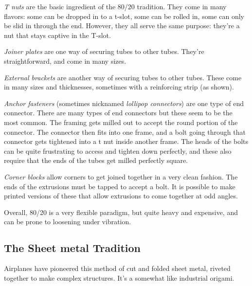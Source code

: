 \documentclass[10pt,letterpaper]{book}
\begin{document}
	\begin{asparaenum}[a)]
		\item \textit{T nuts} are the basic ingredient of the 80/20 tradition. They come in many flavors: some can be dropped in to a t-slot, some can be rolled in, some can only be slid in through the end. However, they all serve the same purpose: they're a nut that stays captive in the T-slot.
		\item \textit{Joiner plates} are one way of securing tubes to other tubes. They're straightforward, and come in many sizes.
		\item \textit{External brackets} are another way of securing tubes to other tubes. These come in many sizes and thicknesses, sometimes with a reinforcing strip (as shown).
		\item \textit{Anchor fasteners} (sometimes nicknamed \textit{lollipop connectors}) are one type of end connector. There are many types of end connectors but these seem to be the most common. The framing gets milled out to accept the round portion of the connector. The connector then fits into one frame, and a bolt going through that connector gets tightened into a t nut inside another frame. The heads of the bolts can be quite frustrating to access and tighten down perfectly, and these also require that the ends of the tubes get milled perfectly square.
		\item \textit{Corner blocks} allow corners to get joined together in a very clean fashion. The ends of the extrusions must be tapped to accept a bolt. It is possible to make printed versions of these that allow extrusions to come together at odd angles.
	\end{asparaenum}
	
	Overall, 80/20 is a very flexible paradigm, but quite heavy and expensive, and can be prone to loosening under vibration.
	
	\subsection{The Sheet metal Tradition}
	Airplanes have pioneered this method of cut and folded sheet metal, riveted together to make complex structures. It's a somewhat like industrial origami.
	
\end{document}
